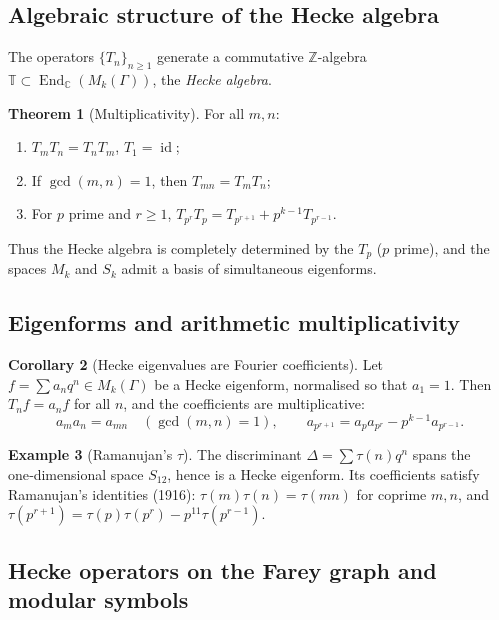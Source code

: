 \documentclass[10pt, a4paper]{article}
\newcommand{\C}{\mathbb{C}}
\newcommand{\Z}{\mathbb{Z}}
\theoremstyle{definition}
\newtheorem{theorem}{Theorem}[section]
\newtheorem{corollary}[theorem]{Corollary}
\newtheorem{example}[theorem]{Example}
\theoremstyle{remark}
\begin{document}
\subsection{Algebraic structure of the Hecke algebra}

The operators $\{T_n\}_{n\geq 1}$ generate a commutative $\Z$-algebra $\mathbb T \subset \operatorname{End}_{\C}(M_k(\Gamma))$, the \emph{Hecke algebra}.

\begin{theorem}[Multiplicativity]
For all $m,n$:
\begin{enumerate}
    \item $T_m T_n = T_n T_m$, \quad $T_1 = \operatorname{id}$;
    \item If $\gcd(m,n)=1$, then $T_{mn} = T_m T_n$;
    \item For $p$ prime and $r\geq 1$, $T_{p^r} T_p = T_{p^{r+1}} + p^{k-1} T_{p^{r-1}}$.
\end{enumerate}
\end{theorem}

Thus the Hecke algebra is completely determined by the $T_p$ ($p$ prime), and the spaces $M_k$ and $S_k$ admit a basis of simultaneous eigenforms.

\subsection{Eigenforms and arithmetic multiplicativity}

\begin{corollary}[Hecke eigenvalues are Fourier coefficients]
Let $f = \sum a_n q^n \in M_k(\Gamma)$ be a Hecke eigenform, normalised so that $a_1=1$. Then $T_n f = a_n f$ for all $n$, and the coefficients are multiplicative:
\[
a_m a_n = a_{mn} \quad (\gcd(m,n)=1),\qquad
a_{p^{r+1}} = a_p a_{p^r} - p^{k-1} a_{p^{r-1}}.
\]
\end{corollary}

\begin{example}[Ramanujan's $\tau$]
The discriminant $\Delta = \sum \tau(n) q^n$ spans the one‑dimensional space $S_{12}$, hence is a Hecke eigenform. Its coefficients satisfy Ramanujan's identities (1916): $\tau(m)\tau(n)=\tau(mn)$ for coprime $m,n$, and $\tau(p^{r+1}) = \tau(p)\tau(p^r) - p^{11}\tau(p^{r-1})$.
\end{example}

\subsection{Hecke operators on the Farey graph and modular symbols}
\label{subsec:farey_hecke}
\end{document}
